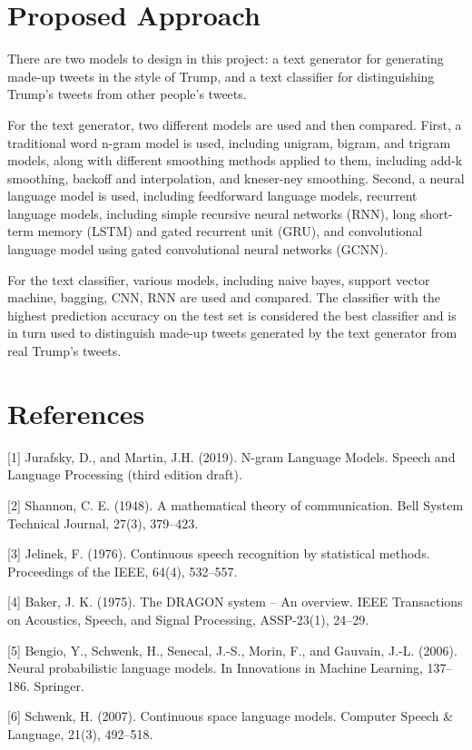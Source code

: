 \documentclass{article}
\begin{document}
\section{Proposed Approach}
There are two models to design in this project: a text generator for generating made-up tweets in the style of Trump, and a text classifier for distinguishing Trump's tweets from other people's tweets.

For the text generator, two different models are used and then compared. First, a traditional word n-gram model is used, including unigram, bigram, and trigram models, along with different smoothing methods applied to them, including add-k smoothing, backoff and interpolation, and kneser-ney smoothing. Second, a neural language model is used, including feedforward language models, recurrent language models, including simple recursive neural networks (RNN), long short-term memory (LSTM) and gated recurrent unit (GRU), and convolutional language model using gated convolutional neural networks (GCNN).

For the text classifier, various models, including naive bayes, support vector machine, bagging, CNN, RNN are used and compared. The classifier with the highest prediction accuracy on the test set is considered the best classifier and is in turn used to distinguish made-up tweets generated by the text generator from real Trump's tweets.
\section*{References}
\small

[1] Jurafsky, D., and Martin, J.H. (2019).  N-gram Language Models. Speech and Language Processing (third edition draft). 

[2] Shannon, C. E. (1948). A mathematical theory of communication. Bell System Technical Journal, 27(3), 379–423.

[3] Jelinek, F. (1976). Continuous speech recognition by statistical methods. Proceedings of the IEEE, 64(4), 532–557.

[4] Baker, J. K. (1975). The DRAGON system – An overview. IEEE Transactions on Acoustics, Speech, and Signal Processing, ASSP-23(1), 24–29.

[5] Bengio, Y., Schwenk, H., Senecal, J.-S., Morin, F., and Gauvain, J.-L. (2006). Neural probabilistic language models. In Innovations in Machine Learning, 137–186. Springer.

[6] Schwenk, H. (2007). Continuous space language models. Computer Speech \& Language, 21(3), 492–518.
\end{document}
